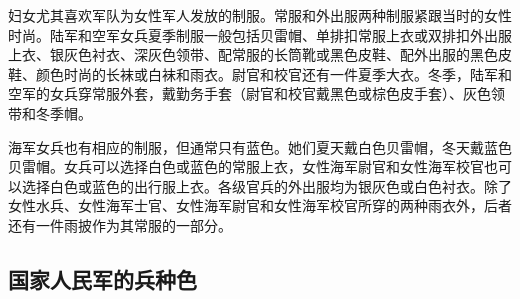 妇女尤其喜欢军队为女性军人发放的制服。常服和外出服两种制服紧跟当时的女性时尚。陆军和空军女兵夏季制服一般包括贝雷帽、单排扣常服上衣或双排扣外出服上衣、银灰色衬衣、深灰色领带、配常服的长筒靴或黑色皮鞋、配外出服的黑色皮鞋、颜色时尚的长袜或白袜和雨衣。尉官和校官还有一件夏季大衣。冬季，陆军和空军的女兵穿常服外套，戴勤务手套（尉官和校官戴黑色或棕色皮手套）、灰色领带和冬季帽。

海军女兵也有相应的制服，但通常只有蓝色。她们夏天戴白色贝雷帽，冬天戴蓝色贝雷帽。女兵可以选择白色或蓝色的常服上衣，女性海军尉官和女性海军校官也可以选择白色或蓝色的出行服上衣。各级官兵的外出服均为银灰色或白色衬衣。除了女性水兵、女性海军士官、女性海军尉官和女性海军校官所穿的两种雨衣外，后者还有一件雨披作为其常服的一部分。

\subsection{国家人民军的兵种色}

